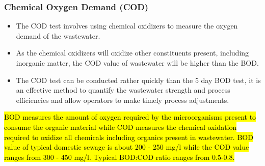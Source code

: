 			    \subsubsection{Chemical Oxygen Demand (COD)}
			      	\begin{itemize}
			      		\item The COD test involves using chemical oxidizers to measure the oxygen demand of the wastewater.
			      		\item As the chemical oxidizers will oxidize other constituents present, including inorganic matter, the COD value of wastewater will be higher than the BOD.  
			      		\item The COD test can be conducted rather quickly than the 5 day BOD test, it is an effective method to quantify the wastewater strength and process efficiencies and allow operators to make timely process adjustments.
			      	\end{itemize}


		
			\hl{BOD measures the amount of oxygen required by the microorganisms present to consume the organic material while COD measures the chemical oxidation required to oxidize all chemicals including organics present in wastewater.  BOD value of typical domestic sewage is about 200 - 250 mg/l while the COD value ranges from 300 - 450 mg/l.  Typical BOD:COD ratio ranges from 0.5-0.8.}\\


